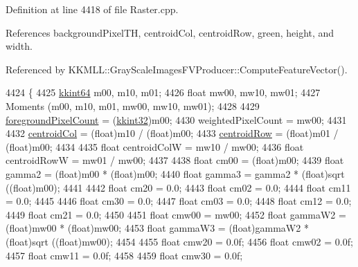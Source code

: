 Definition at line 4418 of file Raster.\+cpp.



References background\+Pixel\+TH, centroid\+Col, centroid\+Row, green, height, and width.



Referenced by K\+K\+M\+L\+L\+::\+Gray\+Scale\+Images\+F\+V\+Producer\+::\+Compute\+Feature\+Vector().


\begin{DoxyCode}
4424 \{
4425   \hyperlink{namespace_k_k_b_aa3486b1c5ea9162b3b020c69f72826eb}{kkint64}  m00,  m10,  m01;
4426   \textcolor{keywordtype}{float}    mw00, mw10, mw01;
4427   Moments (m00, m10, m01, mw00, mw10, mw01);
4428 
4429   \hyperlink{class_k_k_b_1_1_raster_aa7e86253f4b9c347da718732e44b60e8}{foregroundPixelCount} = (\hyperlink{namespace_k_k_b_a8fa4952cc84fda1de4bec1fbdd8d5b1b}{kkint32})m00;
4430   weightedPixelCount   = mw00;
4431 
4432   \hyperlink{class_k_k_b_1_1_raster_ac4cb3984d20f6eef6fd4f201681ea1d5}{centroidCol} = (float)m10 / (\textcolor{keywordtype}{float})m00;
4433   \hyperlink{class_k_k_b_1_1_raster_a3380e5734ec57a147e36c734cc83c5ff}{centroidRow} = (float)m01 / (\textcolor{keywordtype}{float})m00;
4434 
4435   \textcolor{keywordtype}{float} centroidColW  = mw10 / mw00;
4436   \textcolor{keywordtype}{float} centroidRowW  = mw01 / mw00;
4437         
4438   \textcolor{keywordtype}{float}  cm00   = (float)m00;
4439   \textcolor{keywordtype}{float}  gamma2 = (float)m00 * (\textcolor{keywordtype}{float})m00;
4440   \textcolor{keywordtype}{float}  gamma3 = gamma2 * (float)sqrt ((\textcolor{keywordtype}{float})m00);
4441         
4442   \textcolor{keywordtype}{float}  cm20 = 0.0;
4443   \textcolor{keywordtype}{float}  cm02 = 0.0;
4444   \textcolor{keywordtype}{float}  cm11 = 0.0;
4445 
4446   \textcolor{keywordtype}{float}  cm30 = 0.0;
4447   \textcolor{keywordtype}{float}  cm03 = 0.0;
4448   \textcolor{keywordtype}{float}  cm12 = 0.0;
4449   \textcolor{keywordtype}{float}  cm21 = 0.0;
4450 
4451   \textcolor{keywordtype}{float} cmw00   = mw00;
4452   \textcolor{keywordtype}{float} gammaW2 = (\textcolor{keywordtype}{float})mw00 * (\textcolor{keywordtype}{float})mw00;
4453   \textcolor{keywordtype}{float} gammaW3 = (\textcolor{keywordtype}{float})gammaW2 * (\textcolor{keywordtype}{float})sqrt ((\textcolor{keywordtype}{float})mw00);
4454         
4455   \textcolor{keywordtype}{float} cmw20 = 0.0f;
4456   \textcolor{keywordtype}{float} cmw02 = 0.0f;
4457   \textcolor{keywordtype}{float} cmw11 = 0.0f;
4458 
4459   \textcolor{keywordtype}{float} cmw30 = 0.0f;

\end{DoxyCode}
